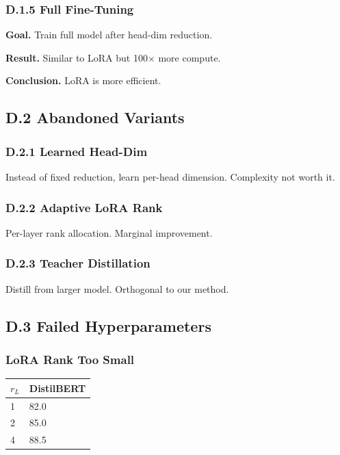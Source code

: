 \subsubsection{D.1.5 Full Fine-Tuning}

\textbf{Goal.} Train full model after head-dim reduction.

\textbf{Result.} Similar to LoRA but 100$\times$ more compute.

\textbf{Conclusion.} LoRA is more efficient.

\subsection{D.2 Abandoned Variants}

\subsubsection{D.2.1 Learned Head-Dim}

Instead of fixed reduction, learn per-head dimension. Complexity not worth it.

\subsubsection{D.2.2 Adaptive LoRA Rank}

Per-layer rank allocation. Marginal improvement.

\subsubsection{D.2.3 Teacher Distillation}

Distill from larger model. Orthogonal to our method.

\subsection{D.3 Failed Hyperparameters}

\subsubsection{LoRA Rank Too Small}
\begin{table}[H]
\centering
\small
\begin{tabular}{ll}
\toprule
\textbf{$r_L$} & \textbf{DistilBERT} \\
\midrule
1 & 82.0 \\
2 & 85.0 \\
4 & 88.5 \\
\bottomrule
\end{tabular}
\end{table}

